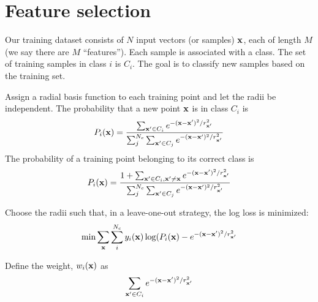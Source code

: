 \documentclass{article}
\newcommand{\bx}{{\bf x}}
\newcommand{\bxp}{\bx^{\prime}}
\begin{document}
\section*{Feature selection}


Our training dataset consists of $N$ input vectors (or samples) $\bx$,
each of length $M$ (we say there are $M$ ``features''). Each sample is
associated with a class. The set of training samples in class $i$ is $C_i$.
The goal is to classify new samples based on the training set.

Assign a radial basis function to each training point and let the
radii be independent. The probability that a new point $\bx$ is in
class $C_i$ is
\[
P_i(\bx) =
\frac{
  \sum_{\bxp \in C_i} e^{-(\bx - \bxp)^2 / r_{\bxp}^2}
}{
  \sum_{j}^{N_c} \sum_{\bxp \in C_j} e^{-(\bx - \bxp)^2 / r_{\bxp}^2}
}
\]
The probability of a training point belonging to its correct class
is
\[
P_i(\bx) =
\frac{
  1 + \sum_{\bxp \in C_i, \bxp \neq \bx} e^{-(\bx - \bxp)^2 / r_{\bxp}^2}
}{
  \sum_{j}^{N_c} \sum_{\bxp \in C_j} e^{-(\bx - \bxp)^2 / r_{\bxp}^2}
}
\]

Choose the radii such that, in a leave-one-out
strategy, the log loss is minimized:
\[
\min \sum_{\bx} \sum_{i}^{N_c} y_i(\bx) \log (P_i(\bx) -
e^{-(\bx - \bxp)^2 / r_{\bxp}^2}
\]

Define the weight, $w_i(\bx)$ as
\[
\sum_{\bxp \in C_i} e^{-(\bx - \bxp)^2 / r_{\bxp}^2}
\]
\end{document}
